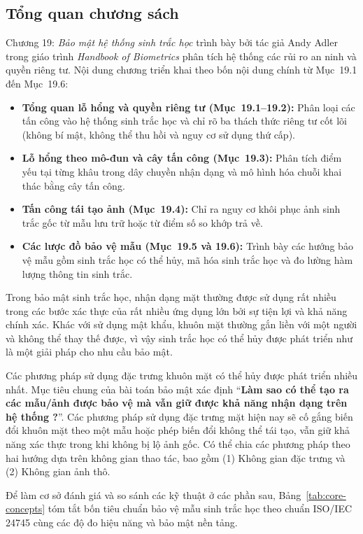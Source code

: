 \documentclass[oneside,a4paper,12pt]{extarticle}
\begin{document}
\subsection{Tổng quan chương sách}
\label{sec:tong-quan}
Chương 19: \textit{Bảo mật hệ thống sinh trắc học} trình bày bởi tác giả Andy Adler trong giáo trình \textit{Handbook of Biometrics} \cite{adler2008} phân tích hệ thống các rủi ro an ninh và quyền riêng tư. Nội dung chương triển khai theo bốn nội dung chính từ Mục~19.1 đến Mục~19.6:
\begin{itemize}\setlength{\itemsep}{2pt}\setlength{\parskip}{0pt}
    \item \textbf{Tổng quan lỗ hổng và quyền riêng tư (Mục~19.1--19.2):} Phân loại các tấn công vào hệ thống sinh trắc học và chỉ rõ ba thách thức riêng tư cốt lõi (không bí mật, không thể thu hồi và nguy cơ sử dụng thứ cấp).
    \item \textbf{Lỗ hổng theo mô-đun và cây tấn công (Mục~19.3):} Phân tích điểm yếu tại từng khâu trong dây chuyền nhận dạng và mô hình hóa chuỗi khai thác bằng cây tấn công.
    \item \textbf{Tấn công tái tạo ảnh (Mục~19.4):} Chỉ ra nguy cơ khôi phục ảnh sinh trắc gốc từ mẫu lưu trữ hoặc từ điểm số so khớp trả về.
    \item \textbf{Các lược đồ bảo vệ mẫu (Mục~19.5 và 19.6):} Trình bày các hướng bảo vệ mẫu gồm sinh trắc học có thể hủy, mã hóa sinh trắc học và đo lường hàm lượng thông tin sinh trắc.
\end{itemize}

Trong bảo mật sinh trắc học, nhận dạng mặt thường được sử dụng rất nhiều trong các bước xác thực của rất nhiều ứng dụng lớn bởi sự tiện lợi và khả năng chính xác. Khác với sử dụng mật khẩu, khuôn mặt thường gắn liền với một người và không thể thay thế được, vì vậy sinh trắc học có thể hủy được phát triển như là một giải pháp cho nhu cầu bảo mật.

Các phương pháp sử dụng đặc trưng khuôn mặt có thể hủy được phát triển nhiều nhất. Mục tiêu chung của bài toán bảo mật xác định ``\textbf{Làm sao có thể tạo ra các mẫu/ảnh được bảo vệ mà vẫn giữ được khả năng nhận dạng trên hệ thống ?}''. Các phương pháp sử dụng đặc trưng mặt hiện nay sẽ cố gắng biến đổi khuôn mặt theo một mẫu hoặc phép biến đổi không thể tái tạo, vẫn giữ khả năng xác thực trong khi không bị lộ ảnh gốc. Có thể chia các phương pháp theo hai hướng dựa trên không gian thao tác, bao gồm (1) Không gian đặc trưng và (2) Không gian ảnh thô.

Để làm cơ sở đánh giá và so sánh các kỹ thuật ở các phần sau, Bảng~\ref{tab:core-concepts} tóm tắt bốn tiêu chuẩn bảo vệ mẫu sinh trắc học theo chuẩn ISO/IEC 24745 \cite{iso24745} cùng các độ đo hiệu năng và bảo mật nền tảng.
\end{document}
